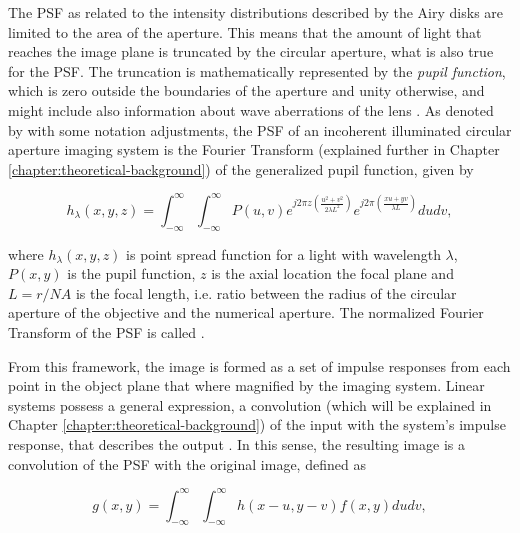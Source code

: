 The PSF as related to the intensity distributions described by the Airy disks are limited to the area of the aperture. This means that the amount of light that reaches the image plane is truncated by the circular aperture, what is also true for the PSF. The truncation is mathematically represented by the \emph{pupil function}, which is zero outside the boundaries of the aperture and unity otherwise, and might include also information about wave aberrations of the lens \cite{goodman1996introduction}. As denoted by  with some notation adjustments, the PSF of an incoherent illuminated circular aperture imaging system is the Fourier Transform (explained further in Chapter \ref{chapter:theoretical-background}) of the generalized pupil function, given by

\begin{equation}
\label{eqn:incoherent_psf}
h_{\lambda}(x,y,z) = \int_{-\infty}^{\infty}
                     \int_{-\infty}^{\infty}
         P(u,v)
         e^{j 2 \pi z
            \left(
                \frac{u^{2} + v^{2}}{2 \lambda L^{2}}        
            \right)
        }
        e^{j 2 \pi
            \left(
                \frac{xu + yv}{\lambda L}        
            \right)
        }
        du dv,
\end{equation}

\noindent where $h_{\lambda}(x,y,z)$ is point spread function for a light with wavelength $\lambda$, $P(x,y)$ is the pupil function, $z$ is the axial location the focal plane and $L = r / NA$ is the focal length, i.e. ratio between the radius of the circular aperture of the objective and the numerical aperture. The normalized Fourier Transform of the PSF is called  \cite{castleman1996digital}.

From this framework, the image is formed as a set of impulse responses from each point in the object plane that where magnified by the imaging system. Linear systems possess a general expression, a convolution (which will be explained in Chapter \ref{chapter:theoretical-background}) of the input with the system's impulse response, that describes the output \cite{brigham1988fast}. In this sense, the resulting image is a convolution of the PSF with the original image, defined as

\begin{equation}
\label{eqn:image_formation_convolution}
g(x,y) = \int_{-\infty}^{\infty}
         \int_{-\infty}^{\infty}
         h(x-u, y-v)f(x,y)du dv,
\end{equation}


